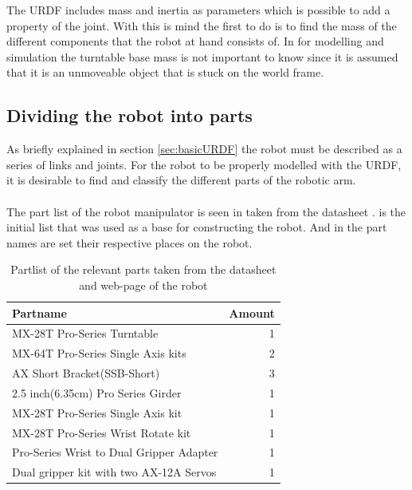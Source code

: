 The URDF includes mass and inertia as parameters which is possible to add a property of the joint. With this is mind the first to do is to find the mass of the different components that the robot at hand consists of. In  for modelling and simulation the turntable base mass is not important to know since it is assumed that it is an unmoveable object that is stuck on the world frame. \\

\subsection{Dividing the robot into parts}
As briefly explained in section \ref{sec:basicURDF} the robot must be described as a series of links and joints. For the robot to be properly modelled with the URDF, it is desirable to find and classify the different parts of the robotic arm.\\\\
The part list of the robot manipulator is seen in  taken from the datasheet \cite{Crustcrawler}.  is the initial list that was used as a base for constructing the robot. And in  the part names are set their respective places on the robot. 

\begin{table}[htbp]
\centering
\caption{Partlist of the relevant parts taken from the datasheet and web-page of the robot}
\label{table:partlist}
    \begin{tabular}{ l r}
        \toprule
        Partname  & Amount \\
        \midrule
        MX-28T Pro-Series Turntable & 1\\
        MX-64T Pro-Series Single Axis kits& 2\\
        AX Short Bracket(SSB-Short) & 3\\
        2.5 inch(6.35cm) Pro Series Girder & 1 \\
        MX-28T Pro-Series Single Axis kit & 1 \\
        MX-28T Pro-Series Wrist Rotate kit & 1\\
        Pro-Series Wrist to Dual Gripper Adapter & 1\\
        Dual gripper kit with two AX-12A Servos& 1\\
               \bottomrule
    \end{tabular}
\end{table}



